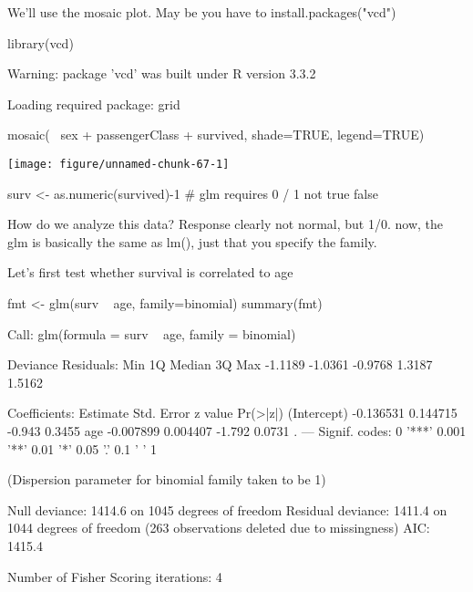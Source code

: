 \documentclass[a4paper,twoside]{tufte-book}\usepackage[]{graphicx}\usepackage[]{color}
\makeatletter
\def\maxwidth{ %
  \ifdim\Gin@nat@width>\linewidth
    \linewidth
  \else
    \Gin@nat@width
  \fi
}
\makeatother
\begin{document}
\begin{appendices}
We'll use the mosaic plot. May be you have to install.packages("vcd")

\begin{Schunk}
\begin{Sinput}
library(vcd)
\end{Sinput}
\begin{Soutput}
Warning: package 'vcd' was built under R version 3.3.2
\end{Soutput}
\begin{Soutput}
Loading required package: grid
\end{Soutput}
\begin{Sinput}
mosaic(~ sex + passengerClass + survived, shade=TRUE, legend=TRUE) 
\end{Sinput}

\texttt{[image: figure/unnamed-chunk-67-1]} \begin{Sinput}
surv <- as.numeric(survived)-1 # glm requires 0 / 1 not true false
\end{Sinput}
\end{Schunk}

How do we analyze this data? Response clearly not normal, but 1/0. now, the glm is basically the same as lm(), just that you specify the family.

Let's first test whether survival is correlated to age

\begin{Schunk}
\begin{Sinput}
fmt <- glm(surv ~ age, family=binomial)
summary(fmt)
\end{Sinput}
\begin{Soutput}

Call:
glm(formula = surv ~ age, family = binomial)

Deviance Residuals: 
    Min       1Q   Median       3Q      Max  
-1.1189  -1.0361  -0.9768   1.3187   1.5162  

Coefficients:
             Estimate Std. Error z value Pr(>|z|)  
(Intercept) -0.136531   0.144715  -0.943   0.3455  
age         -0.007899   0.004407  -1.792   0.0731 .
---
Signif. codes:  0 '***' 0.001 '**' 0.01 '*' 0.05 '.' 0.1 ' ' 1

(Dispersion parameter for binomial family taken to be 1)

    Null deviance: 1414.6  on 1045  degrees of freedom
Residual deviance: 1411.4  on 1044  degrees of freedom
  (263 observations deleted due to missingness)
AIC: 1415.4

Number of Fisher Scoring iterations: 4
\end{Soutput}
\end{Schunk}


\end{appendices}
\end{document}
